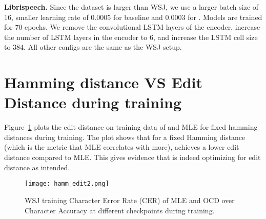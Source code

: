 \begin{appendices}
{\bf Librispeech.} Since the dataset is larger than WSJ, we use a larger batch size of 16, smaller learning rate of $0.0005$ for baseline and $0.0003$ for \acronym. Models are trained for 70 epochs. We remove the convolutional LSTM layers of the encoder, increase the number of LSTM layers in the encoder to 6, and increase the LSTM cell size to 384. All other configs are the same as the WSJ setup.

\section{Hamming distance VS Edit Distance during training}
\label{sec:hamm}
Figure~\ref{fig:hamedit} plots the edit distance on training data of \acronym and MLE for fixed hamming distances during training. The plot shows that for a fixed Hamming distance (which is the metric that MLE correlates with more), \acronym achieves a lower edit distance compared to MLE. This gives evidence that \acronym is indeed optimizing for edit distance as intended.

\begin{figure}[h]
\centering
  \texttt{[image: hamm\_edit2.png]}
\caption{WSJ training Character Error Rate (CER) of MLE and OCD over Character Accuracy at different checkpoints during training. 
}
\label{fig:hamedit}
\end{figure}


\end{appendices}
